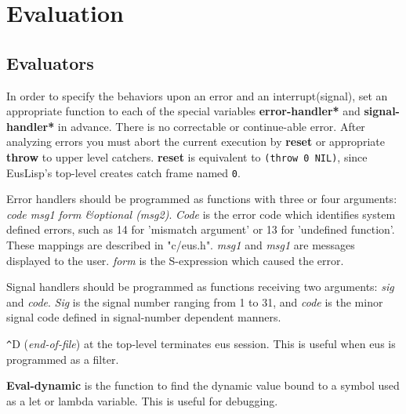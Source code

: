 \section{Evaluation}

\subsection{Evaluators}

In order to specify the behaviors upon an error and an interrupt(signal),
set an appropriate function to each of the special variables
{\bf *error-handler*} and {\bf *signal-handler*} in advance.
There is no correctable or continue-able error.
After analyzing errors you must abort the current execution by
{\bf reset} or appropriate {\bf throw} to upper level catchers.
{\bf reset} is equivalent to {\tt (throw 0 NIL)}, since EusLisp's top-level
creates catch frame named {\tt 0}.

Error handlers should be programmed as functions with three or four
arguments:  {\em code msg1 form \&optional (msg2)}.
{\em Code} is the error code which identifies system defined errors,
such as 14 for 'mismatch argument' or 13 for 'undefined function'.
These mappings are described in "c/eus.h".
{\em msg1} and {\em msg1} are messages displayed to the user.
{\em form} is the S-expression which caused the error.

Signal handlers should be programmed as functions receiving
two arguments: {\em sig} and {\em code}. 
{\em Sig} is the signal number ranging from 1 to 31, and {\em code}
is the minor signal code defined in signal-number dependent manners.

\verb+^+D ({\em end-of-file}) at the top-level terminates eus session.
This is useful when eus is programmed as a filter.

{\bf Eval-dynamic} is the function to find the dynamic value bound
to a symbol used as a let or lambda variable.
This is useful for debugging.


